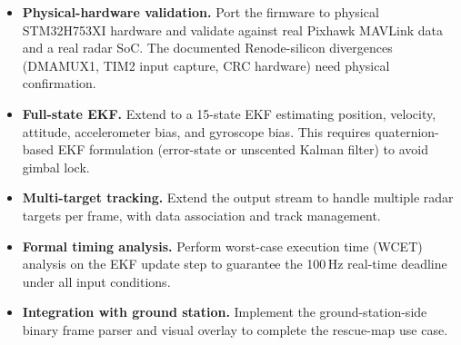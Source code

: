 \begin{itemize}
\item \textbf{Physical-hardware validation.} Port the firmware to physical STM32H753XI hardware and validate against real Pixhawk MAVLink data and a real radar SoC. The documented Renode-silicon divergences (DMAMUX1, TIM2 input capture, CRC hardware) need physical confirmation.

\item \textbf{Full-state EKF.} Extend to a 15-state EKF estimating position, velocity, attitude, accelerometer bias, and gyroscope bias. This requires quaternion-based EKF formulation (error-state or unscented Kalman filter) to avoid gimbal lock.

\item \textbf{Multi-target tracking.} Extend the output stream to handle multiple radar targets per frame, with data association and track management.

\item \textbf{Formal timing analysis.} Perform worst-case execution time (WCET) analysis on the EKF update step to guarantee the 100\,Hz real-time deadline under all input conditions.

\item \textbf{Integration with ground station.} Implement the ground-station-side binary frame parser and visual overlay to complete the rescue-map use case.
\end{itemize}